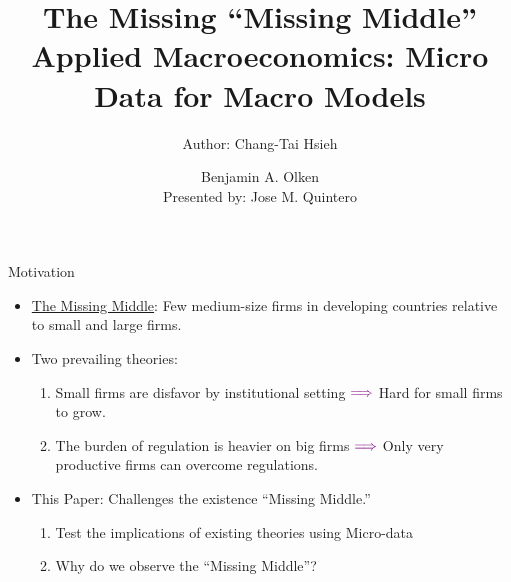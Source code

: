 \documentclass[usenames,dvipsnames,aspectratio=32]{beamer}
\title{The Missing ``Missing Middle'' \\ \small{Applied Macroeconomics: Micro Data for Macro Models} }
\author{Author: Chang-Tai Hsieh \and Benjamin A. Olken \\ Presented by: Jose M. Quintero}
\begin{document}
\begin{frame}
  \titlepage
\end{frame}

\begin{frame}{Motivation}
    \begin{itemize}[label=\textcolor{violet}{$\blacktriangleright$}]
        \item \underline{The Missing Middle}: Few medium-size firms in developing countries relative to small and large firms. 
        \vfill
        \item Two prevailing theories:
        \begin{enumerate}[label=\textbf{\textcolor{violet}{\arabic*.}}]
            \item Small firms are disfavor by institutional setting $\textcolor{violet}{\Longrightarrow}$ Hard for small firms to grow.
            \item The burden of regulation is heavier on big firms $\textcolor{violet}{\Longrightarrow}$ Only very productive firms can overcome regulations. 
        \end{enumerate}
        \vfill 
        \item This Paper: Challenges the existence ``Missing Middle.''
        \begin{enumerate}[label=\textbf{\textcolor{violet}{\arabic*.}}]
            \item Test the implications of existing theories using Micro-data
            \item Why do we observe the ``Missing Middle''? 
        \end{enumerate}     
    \end{itemize}
\end{frame}
\end{document}
